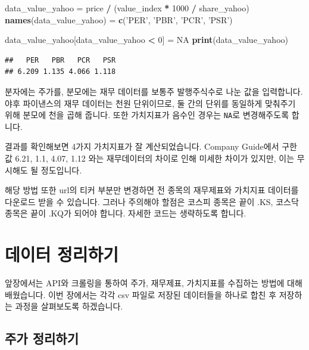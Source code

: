 \documentclass[12pt,]{book}
\newenvironment{Shaded}{\begin{snugshade}}{\end{snugshade}}
\newcommand{\DecValTok}[1]{\textcolor[rgb]{0.00,0.00,0.81}{#1}}
\newcommand{\KeywordTok}[1]{\textcolor[rgb]{0.13,0.29,0.53}{\textbf{#1}}}
\newcommand{\NormalTok}[1]{#1}
\newcommand{\OperatorTok}[1]{\textcolor[rgb]{0.81,0.36,0.00}{\textbf{#1}}}
\newcommand{\OtherTok}[1]{\textcolor[rgb]{0.56,0.35,0.01}{#1}}
\newcommand{\StringTok}[1]{\textcolor[rgb]{0.31,0.60,0.02}{#1}}
\begin{document}
\begin{Shaded}
\begin{Highlighting}[]
\NormalTok{data_value_yahoo =}\StringTok{ }\NormalTok{price }\OperatorTok{/}\StringTok{ }\NormalTok{(value_index }\OperatorTok{*}\StringTok{ }\DecValTok{1000} \OperatorTok{/}\StringTok{ }\NormalTok{share_yahoo)}
\KeywordTok{names}\NormalTok{(data_value_yahoo) =}\StringTok{ }\KeywordTok{c}\NormalTok{(}\StringTok{'PER'}\NormalTok{, }\StringTok{'PBR'}\NormalTok{, }\StringTok{'PCR'}\NormalTok{, }\StringTok{'PSR'}\NormalTok{)}

\NormalTok{data_value_yahoo[data_value_yahoo }\OperatorTok{<}\StringTok{ }\DecValTok{0}\NormalTok{] =}\StringTok{ }\OtherTok{NA}
\KeywordTok{print}\NormalTok{(data_value_yahoo)}
\end{Highlighting}
\end{Shaded}

\begin{verbatim}
##   PER   PBR   PCR   PSR 
## 6.209 1.135 4.066 1.118
\end{verbatim}

분자에는 주가를, 분모에는 재무 데이터를 보통주 발행주식수로 나눈 값을 입력합니다. 야후 파이낸스의 재무 데이터는 천원 단위이므로, 둘 간의 단위를 동일하게 맞춰주기 위해 분모에 천을 곱해 줍니다. 또한 가치지표가 음수인 경우는 \texttt{NA}로 변경해주도록 합니다.

결과를 확인해보면 4가지 가치지표가 잘 계산되었습니다. Company Guide에서 구한 값 6.21, 1.1, 4.07, 1.12 와는 재무데이터의 차이로 인해 미세한 차이가 있지만, 이는 무시해도 될 정도입니다.

해당 방법 또한 url의 티커 부분만 변경하면 전 종목의 재무제표와 가치지표 데이터를 다운로드 받을 수 있습니다. 그러나 주의해야 할점은 코스피 종목은 끝이 .KS, 코스닥 종목은 끝이 .KQ가 되어야 합니다. 자세한 코드는 생략하도록 합니다.

\hypertarget{section-34}{%
\chapter{데이터 정리하기}\label{section-34}}

앞장에서는 API와 크롤링을 통하여 주가, 재무제표, 가치지표를 수집하는 방법에 대해 배웠습니다. 이번 장에서는 각각 csv 파일로 저장된 데이터들을 하나로 합친 후 저장하는 과정을 살펴보도록 하겠습니다.

\hypertarget{section-35}{%
\section{주가 정리하기}\label{section-35}}
\end{document}
